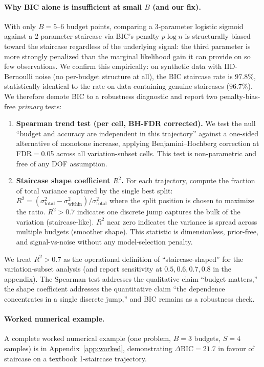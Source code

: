 \documentclass{article}
\begin{document}
\paragraph{Why BIC alone is insufficient at small $B$ (and our fix).}
With only $B{=}5$--$6$ budget points, comparing a 3-parameter logistic sigmoid against a 2-parameter staircase via BIC's penalty $p \log n$ is structurally biased toward the staircase regardless of the underlying signal: the third parameter is more strongly penalized than the marginal likelihood gain it can provide on so few observations.  We confirm this empirically: on synthetic data with IID-Bernoulli noise (no per-budget structure at all), the BIC staircase rate is $97.8\%$, statistically identical to the rate on data containing genuine staircases ($96.7\%$).  We therefore demote BIC to a robustness diagnostic and report two penalty-bias-free \emph{primary} tests:

\begin{enumerate}[leftmargin=*,itemsep=1pt]
    \item \textbf{Spearman trend test (per cell, BH-FDR corrected).}  We test the null ``budget and accuracy are independent in this trajectory'' against a one-sided alternative of monotone increase, applying Benjamini--Hochberg correction at FDR$=$0.05 across all variation-subset cells.  This test is non-parametric and free of any DOF assumption.
    \item \textbf{Staircase shape coefficient $R^2$.}  For each trajectory, compute the fraction of total variance captured by the single best split: $R^2 = (\sigma^2_{\text{total}} - \sigma^2_{\text{within}}) / \sigma^2_{\text{total}}$ where the split position is chosen to maximize the ratio.  $R^2 > 0.7$ indicates one discrete jump captures the bulk of the variation (staircase-like).  $R^2$ near zero indicates the variance is spread across multiple budgets (smoother shape).  This statistic is dimensionless, prior-free, and signal-vs-noise without any model-selection penalty.
\end{enumerate}

We treat $R^2 > 0.7$ as the operational definition of ``staircase-shaped'' for the variation-subset analysis (and report sensitivity at $0.5, 0.6, 0.7, 0.8$ in the appendix).  The Spearman test addresses the qualitative claim ``budget matters,'' the shape coefficient addresses the quantitative claim ``the dependence concentrates in a single discrete jump,'' and BIC remains as a robustness check.

\paragraph{Worked numerical example.}  A complete worked numerical example (one problem, $B{=}3$ budgets, $S{=}4$ samples) is in Appendix~\ref{app:worked}, demonstrating $\Delta\text{BIC}{=}21.7$ in favour of staircase on a textbook 1-staircase trajectory.
\end{document}
